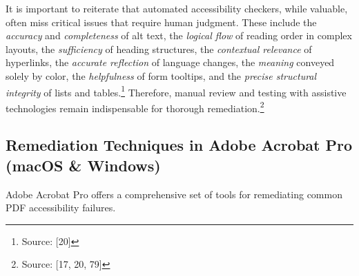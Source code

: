 It is important to reiterate that automated accessibility checkers, while valuable, often miss critical issues that require human judgment. These include the \textit{accuracy} and \textit{completeness} of alt text, the \textit{logical flow} of reading order in complex layouts, the \textit{sufficiency} of heading structures, the \textit{contextual relevance} of hyperlinks, the \textit{accurate reflection} of language changes, the \textit{meaning} conveyed solely by color, the \textit{helpfulness} of form tooltips, and the \textit{precise structural integrity} of lists and tables.\footnote{Source: [20]} Therefore, manual review and testing with assistive technologies remain indispensable for thorough remediation.\footnote{Source: [17, 20, 79]}

\subsection{Remediation Techniques in Adobe Acrobat Pro (macOS \& Windows)}

Adobe Acrobat Pro offers a comprehensive set of tools for remediating common PDF accessibility failures.

